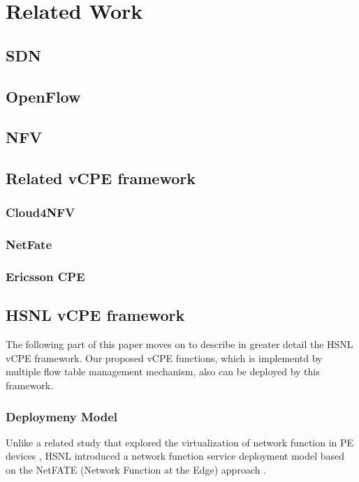 \chapter{Related Work} \label{ch:related_work}
\section{SDN}



\section{OpenFlow}



\section{NFV}



\section{Related vCPE framework}
\subsection{Cloud4NFV}


\subsection{NetFate}


\subsection{Ericsson CPE}



\section{HSNL vCPE framework}
The following part of this paper moves on to describe in greater detail the HSNL vCPE framework. Our proposed vCPE functions, which is implementd by multiple flow table management mechanism, also can be deployed by this framework.


\subsection{Deploymeny Model}
Unlike a related study that explored the virtualization of network function in PE devices \cite{vcpe-enhance}, HSNL introduced a network function service deployment model based on the NetFATE (Network Function at the Edge) approach \cite{netfate}.

